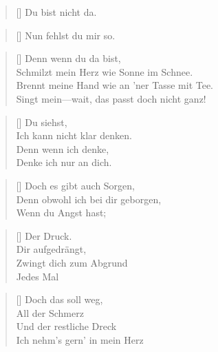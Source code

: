 \documentclass[twocolumn]{article}
\title{
	\vspace{-5cm}
	\begin{flushleft}
		\titlevar \quad \raisebox{0.15em}{\normalsize(\authorvar)}
	\end{flushleft}
	}
\date{
	\vspace{-1.2cm}
	\begin{flushleft}
		\datevar
	\end{flushleft} 
	}
\newenvironment{Strophe}{\begin{minipage}{\versewidth} \begin{verse}[\versewidth]}{\end{verse} \end{minipage}\vspace{0.5em}}
\begin{document}
	\maketitle
	\thispagestyle{empty}
	
	\begin{Strophe}
		Du bist nicht da.
	\end{Strophe}
	
	\begin{Strophe}
		Nun fehlst du mir so.
	\end{Strophe}
	
	\begin{Strophe}
		Denn wenn du da bist, \\
		Schmilzt mein Herz wie Sonne im Schnee. \\
		Brennt meine Hand wie an 'ner Tasse mit Tee. \\
		Singt mein—wait, das passt doch nicht ganz! \\
	\end{Strophe}
	
	\begin{Strophe}
		Du siehst, \\
		Ich kann nicht klar denken. \\
		Denn wenn ich denke, \\
		Denke ich nur an dich. \\
	\end{Strophe}
	
	\begin{Strophe}
		Doch es gibt auch Sorgen, \\
		Denn obwohl ich bei dir geborgen, \\
		Wenn du Angst hast; \\
	\end{Strophe}
	
	\begin{Strophe}
		Der Druck. \\
		Dir aufgedrängt, \\
		Zwingt dich zum Abgrund \\
		Jedes Mal \\
	\end{Strophe}
	
	\begin{Strophe}
		Doch das soll weg, \\
		All der Schmerz \\
		Und der restliche Dreck \\
		Ich nehm's gern' in mein Herz  \\
	\end{Strophe}
	
\end{document}
